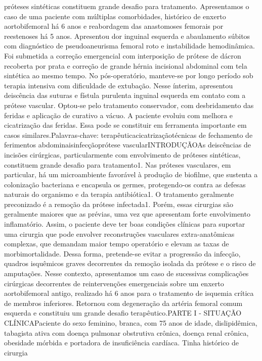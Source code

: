 \documentclass[numberinsection,times,10pt,spreadimages]{memoir}
\begin{document}
próteses sintéticas constituem
grande desafio para tratamento. Apresentamos o caso de uma paciente com
múltiplas comorbidades, histórico de enxerto aortobifemoral há 6 anos e
reabordagem das anastomoses femorais por reestenoses há 5 anos. Apresentou dor
inguinal esquerda e abaulamento súbitos com diagnóstico de pseudoaneurisma
femoral roto e instabilidade hemodinâmica. Foi submetida a correção emergencial
com interposição de prótese de dácron recoberta por prata e correção de grande
hérnia incisional abdominal com tela sintética ao mesmo tempo. No
pós-operatório, manteve-se por longo período sob terapia intensiva com
dificuldade de extubação. Nesse ínterim, apresentou deiscência das suturas e
fístula purulenta inguinal esquerda em contato com a prótese vascular. Optou-se
pelo tratamento conservador, com desbridamento das feridas e aplicação de
curativo a vácuo. A paciente evoluiu com melhora e cicatrização das feridas.
Essa pode se constituir em ferramenta importante em casos
similares.Palavras-chave: terapêuticacicatrizaçãotécnicas de fechamento de
ferimentos abdominaisinfecçãoprótese vascularINTRODUÇÃOAs deiscências de
incisões cirúrgicas, particularmente com envolvimento de próteses
sintéticas, constituem grande desafio para tratamento1. Nas próteses vasculares,
em particular, há um
microambiente favorável à produção de biofilme, que sustenta a colonização
bacteriana e encapsula os germes, protegendo-os contra as defesas naturais do
organismo e da terapia antibiótica1. O tratamento geralmente preconizado é a
remoção da prótese
infectada1. Porém, essas
cirurgias são geralmente maiores que as prévias, uma vez que apresentam forte
envolvimento inflamatório. Assim, o paciente deve ter boas condições clínicas
para
suportar uma cirurgia que pode envolver reconstruções vasculares
extra-anatômicas
complexas, que demandam maior tempo operatório e elevam as taxas de
morbimortalidade. Dessa forma, pretende-se evitar a progressão da infecção,
quadros
isquêmicos graves decorrentes da remoção isolada da prótese e o risco de
amputações.
Nesse contexto, apresentamos um caso de sucessivas complicações cirúrgicas
decorrentes de reintervenções emergenciais sobre um enxerto aortobifemoral
antigo,
realizado há 6 anos para o tratamento de isquemia crítica de membros inferiores.
Retornou com degeneração da artéria femoral comum esquerda e constituiu um
grande
desafio terapêutico.PARTE I - SITUAÇÃO CLÍNICAPaciente do sexo feminino, branca,
com 75 anos de idade, dislipidêmica, tabagista
ativa com doença pulmonar obstrutiva crônica, doença renal crônica, obesidade
mórbida e portadora de insuficiência cardíaca. Tinha histórico de cirurgia
\end{document}
